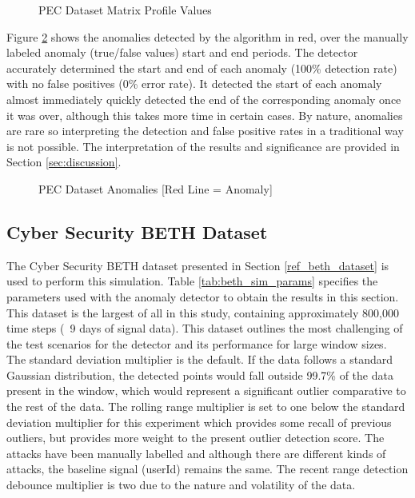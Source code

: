 \begin{figure}[H]
    
    \caption{PEC Dataset Matrix Profile Values}
    \label{fig:pec_mp_hist}
\end{figure}

Figure \ref{fig:pec_outliers} shows the anomalies detected by the algorithm in red, over the manually labeled anomaly (true/false values) start and end periods. The detector accurately determined the start and end of each anomaly (100\% detection rate) with no false positives (0\% error rate). It detected the start of each anomaly almost immediately quickly detected the end of the corresponding anomaly once it was over, although this takes more time in certain cases. By nature, anomalies are rare so interpreting the detection and false positive rates in a traditional way is not possible. The interpretation of the results and significance are provided in Section \ref{sec:discussion}.
 
\begin{figure}[H]
    
    \caption{PEC Dataset Anomalies [Red Line = Anomaly]}
    \label{fig:pec_outliers}
\end{figure}

\subsection{Cyber Security BETH Dataset}
\label{ref_results_beth_sim}
The Cyber Security BETH dataset presented in Section \ref{ref_beth_dataset} is used to perform this simulation. Table \ref{tab:beth_sim_params} specifies the parameters used with the anomaly detector to obtain the results in this section. This dataset is the largest of all in this study, containing approximately 800,000 time steps (~9 days of signal data). This dataset outlines the most challenging of the test scenarios for the detector and its performance for large window sizes. The standard deviation multiplier is the default. If the data follows a standard Gaussian distribution, the detected points would fall outside 99.7\% of the data present in the window, which would represent a significant outlier comparative to the rest of the data. The rolling range multiplier is set to one below the standard deviation multiplier for this experiment which provides some recall of previous outliers, but provides more weight to the present outlier detection score. The attacks have been manually labelled and although there are different kinds of attacks, the baseline signal (userId) remains the same. The recent range detection debounce multiplier is two due to the nature and volatility of the data.

